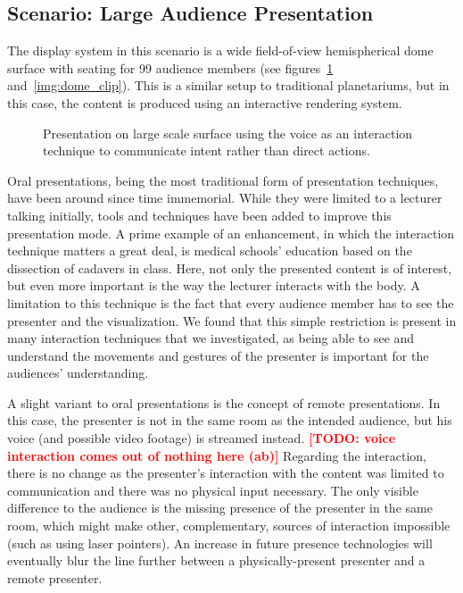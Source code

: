\documentclass[review,journal]{vgtc}         %
\newcommand{\todo}[1]{\textbf{\textcolor{red}{[TODO: {#1}]}}}
\begin{document}
\subsection{Scenario: Large Audience Presentation} \label{sec:largeaudience}
The display system in this scenario is a wide field-of-view hemispherical dome surface with seating for 99 audience members (see figures~\ref{img:dome_presentation} and~\ref{img:dome_clip}).
This is a similar setup to traditional planetariums, but in this case, the content is produced using an interactive rendering system.

\begin{figure}[htb]
	\centering
	\caption{Presentation on large scale surface using the voice as an interaction technique to communicate intent rather than direct actions.}
	\label{img:dome_presentation}
\end{figure}

Oral presentations, being the most traditional form of presentation techniques, have been around since time immemorial.
While they were limited to a lecturer talking initially, tools and techniques have been added to improve this presentation mode.
A prime example of an enhancement, in which the interaction technique matters a great deal, is medical schools' education based on the dissection of cadavers in class.
Here, not only the presented content is of interest, but even more important is the way the lecturer interacts with the body.
A limitation to this technique is the fact that every audience member has to see the presenter and the visualization.
We found that this simple restriction is present in many interaction techniques that we investigated, as being able to see and understand the movements and gestures of the presenter is important for the audiences' understanding.

A slight variant to oral presentations is the concept of remote presentations.
In this case, the presenter is not in the same room as the intended audience, but his voice (and possible video footage) is streamed instead.
\todo{voice interaction comes out of nothing here (ab)} Regarding the interaction, there is no change as the presenter's interaction with the content was limited to communication and there was no physical input necessary.
The only visible difference to the audience is the missing presence of the presenter in the same room, which might make other, complementary, sources of interaction impossible (such as using laser pointers).
An increase in future presence technologies will eventually blur the line further between a physically-present presenter and a remote presenter.
\end{document}
